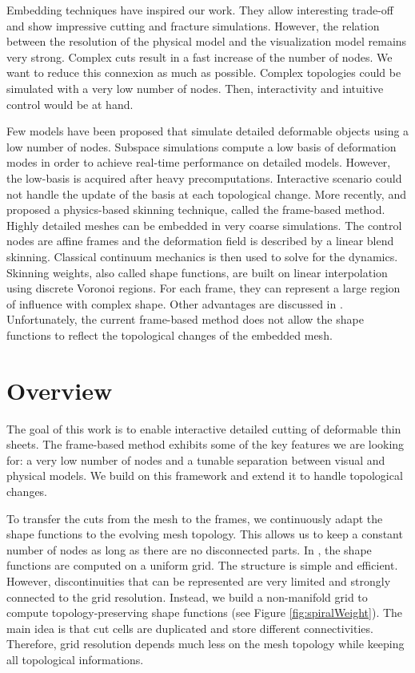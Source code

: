 Embedding techniques have inspired our work. They allow interesting trade-off and show impressive cutting and fracture simulations. However, the relation between the resolution of the physical model and the visualization model remains very strong. Complex cuts result in a fast increase of the number of nodes. We want to reduce this connexion as much as possible. Complex topologies could be simulated with a very low number of nodes. Then, interactivity and intuitive control would be at hand.

Few models have been proposed that simulate detailed deformable objects using a low number of nodes. Subspace simulations \cite{Barbic:2005:RTSI} compute a low basis of deformation modes in order to achieve real-time performance on detailed models. However, the low-basis is acquired after heavy precomputations. Interactive scenario could not handle the update of the basis at each topological change. More recently, \cite{Gilles2011} and \cite{Faure2011} proposed a physics-based skinning technique, called the frame-based method. Highly detailed meshes can be embedded in very coarse simulations. The control nodes are affine frames and the deformation field is described by a linear blend skinning. Classical continuum mechanics is then used to solve for the dynamics. Skinning weights, also called shape functions, are built on linear interpolation using discrete Voronoi regions. For each frame, they can represent a large region of influence with complex shape. Other advantages are discussed in \cite{Faure2011}. Unfortunately, the current frame-based method does not allow the shape functions to reflect the topological changes of the embedded mesh.

\section{Overview}

The goal of this work is to enable interactive detailed cutting of deformable thin sheets. The frame-based method exhibits some of the key features we are looking for: a very low number of nodes and a tunable separation between visual and physical models.  We build on this framework and extend it to handle topological changes.

To transfer the cuts from the mesh to the frames, we continuously adapt the shape functions to the evolving mesh topology. This allows us to keep a constant number of nodes as long as there are no disconnected parts. In \cite{Faure2011}, the shape functions are computed on a uniform grid. The structure is simple and efficient. However, discontinuities that can be represented are very limited and strongly connected to the grid resolution. Instead, we build a non-manifold grid to compute topology-preserving shape functions (see Figure \ref{fig:spiralWeight}). The main idea is that cut cells are duplicated and store different connectivities. Therefore, grid resolution depends much less on the mesh topology while keeping all topological informations.

